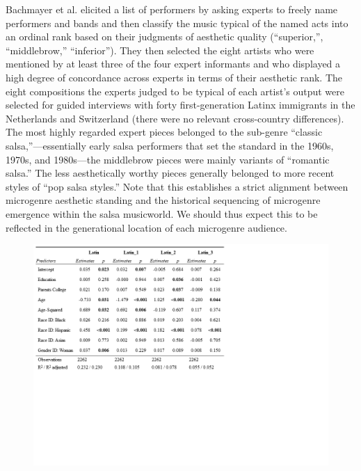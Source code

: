 \documentclass[a4paper,12pt]{extarticle}
\begin{document}
Bachmayer et al. elicited a list of performers by asking experts to freely name performers and bands and then classify the music typical of the named acts into an ordinal rank based on their judgments of aesthetic quality (``superior,'', ``middlebrow,'' ``inferior''). They then selected the eight artists who were mentioned by at least three of the four expert informants and who displayed a high degree of concordance across experts in terms of their aesthetic rank. The eight compositions the experts judged to be typical of each artist's output were selected for guided interviews with forty first-generation Latinx immigrants in the Netherlands and Switzerland (there were no relevant cross-country differences). The most highly regarded expert pieces belonged to the sub-genre ``classic salsa,''---essentially early salsa performers that set the standard in the 1960s, 1970s, and 1980s---the middlebrow pieces were mainly variants of ``romantic salsa.'' The less aesthetically worthy pieces generally belonged to more recent styles of ``pop salsa styles.'' Note that this establishes a strict alignment between microgenre aesthetic standing and the historical sequencing of microgenre emergence within the salsa musicworld. We should thus expect this to be reflected in the generational location of each microgenre audience.

\begin{figure}[ht!]
    \centering    
    \includegraphics[width=1.5\textwidth]{Tabs/reg-tab-latin.png}
    \caption{}
    \label{tab:reg-latin}
\end{figure}
\end{document}
